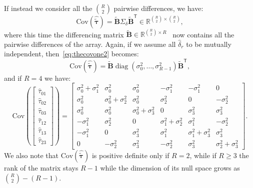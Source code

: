 \noindent
If instead we consider all the \(\binom{R}{2}\) pairwise differences, we have:
\begin{equation}
\text{Cov}(\hat{\boldsymbol{\tilde{\tau}}})=\tilde{\mathbf{B}}\Sigma_\delta\tilde{\mathbf{B}}^\mathsf{T}\in\mathbb{R}^{\binom{R}{2}\times \binom{R}{2}},
\label{eq:thecovone2}
\end{equation}
where this time the differencing matrix \(\tilde{\mathbf{B}}\in \mathbb{R}^{\binom{R}{2}\times R}\)~\cite{Least-squares-range} now contains all the pairwise differences of the array.
Again, if we assume all \(\hat{\delta}_{r}\) to be mutually independent, then~\eqref{eq:thecovone2} becomes:
\begin{equation}
\text{Cov}(\hat{\boldsymbol{\tilde{\tau}}})=\tilde{\mathbf{B}}
\operatorname{diag}\left(\sigma_0^2, \ldots, \sigma_{R-1}^2\right)
\tilde{\mathbf{B}}^\mathsf{T},
\end{equation}
and if \(R=4\) we have:
\begin{equation}
\text{Cov}
\left(\left[\begin{array}{c}
\hat{\tau}_{01} \\
\hat{\tau}_{02} \\
\hat{\tau}_{03} \\
\hat{\tau}_{12} \\
\hat{\tau}_{13} \\
\hat{\tau}_{23}
\end{array}\right]\right)
=
\left[\begin{array}{cccccc}
\sigma_0^2+\sigma_1^2 & \sigma_0^2 & \sigma_0^2 & -\sigma_1^2 & -\sigma_1^2 & 0 \\
\sigma_0^2 & \sigma_0^2+\sigma_2^2 & \sigma_0^2 & \sigma_2^2 & 0 & -\sigma_2^2 \\
\sigma_0^2 & \sigma_0^2 & \sigma_0^2+\sigma_3^2 & 0 & \sigma_3^2 & \sigma_3^2 \\
-\sigma_1^2 & \sigma_2^2 & 0 & \sigma_1^2+\sigma_2^2 & \sigma_1^2 & -\sigma_2^2 \\
-\sigma_1^2 & 0 & \sigma_3^2 & \sigma_1^2 & \sigma_1^2+\sigma_3^2 & \sigma_3^2 \\
0 & -\sigma_2^2 & \sigma_3^2 & -\sigma_2^2 & \sigma_3^2 & \sigma_2^2+\sigma_3^2
\end{array}\right].
\end{equation}
We also note that \(\text{Cov}(\hat{\boldsymbol{\tilde{\tau}}})\) is positive definite only if \(R=2\), while if \(R\geq 3\) the rank of the matrix stays \(R-1\) while the dimension of its null space grows as \(\binom{R}{2}-(R-1)\).

